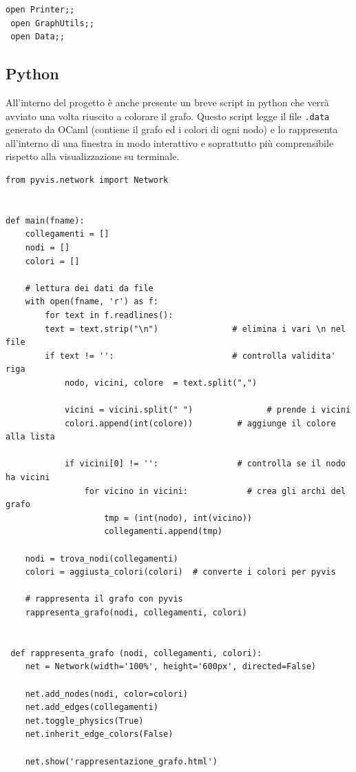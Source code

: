 \begin{lstlisting}[style=caml, caption={Inclusione degli altri file .ml}]
 open Printer;;
 open GraphUtils;;
 open Data;;
\end{lstlisting}
\subsection{Python}

All'interno del progetto è anche presente un breve script in python che verrà avviato una volta riuscito a colorare il grafo. Questo script legge il file \lstinline[style=cmd]|.data| generato da OCaml (contiene il grafo ed i colori di ogni nodo) e lo rappresenta all’interno di una finestra in modo interattivo e soprattutto più comprensibile rispetto alla visualizzazione su terminale.\\

\begin{lstlisting}[style=python, caption={Alcune funzioni dello script python}]
from pyvis.network import Network


def main(fname):
	collegamenti = []
	nodi = []
	colori = []

	# lettura dei dati da file
	with open(fname, 'r') as f:
		for text in f.readlines():
		text = text.strip("\n")               # elimina i vari \n nel file
		if text != '':                        # controlla validita' riga
			nodo, vicini, colore  = text.split(",")

			vicini = vicini.split(" ")  			 # prende i vicini
			colori.append(int(colore))         # aggiunge il colore alla lista

			if vicini[0] != '':                # controlla se il nodo ha vicini
				for vicino in vicini:            # crea gli archi del grafo
					tmp = (int(nodo), int(vicino))
					collegamenti.append(tmp)    

	nodi = trova_nodi(collegamenti) 
	colori = aggiusta_colori(colori)  # converte i colori per pyvis
	
	# rappresenta il grafo con pyvis
	rappresenta_grafo(nodi, collegamenti, colori) 
 
 
 def rappresenta_grafo (nodi, collegamenti, colori):
	net = Network(width='100%', height='600px', directed=False)
 
 	net.add_nodes(nodi, color=colori)
 	net.add_edges(collegamenti)
 	net.toggle_physics(True)
 	net.inherit_edge_colors(False)
 
 	net.show('rappresentazione_grafo.html')
   		
\end{lstlisting}

